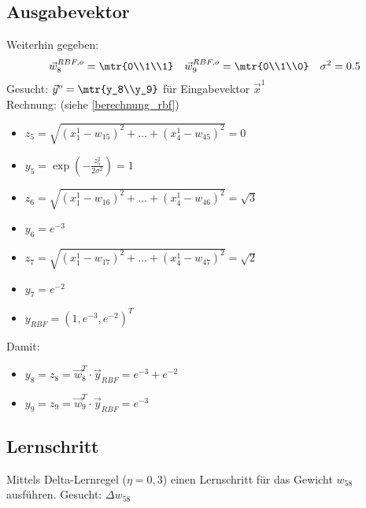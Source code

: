 \subsection{Ausgabevektor}
Weiterhin gegeben:
$$\vec{w}_8^{RBF,o}=\mtr{0\\1\\1} \quad \vec{w}_9^{RBF,o}=\mtr{0\\1\\0} \quad \sigma^2 = 0.5$$
Gesucht: $\vec{y}^{o}=\mtr{y_8\\y_9}$ für Eingabevektor $\vec{x}^1$\\
Rechnung: (siehe \autoref{berechnung_rbf})
\begin{itemize}
\item $z_5 = \sqrt{(x_1^1-w_{15})^2+\ldots+(x_4^1-w_{45})^2}=0$
\item $y_5=\exp\left(- \frac{z_5^2}{2 \sigma^2}\right)=1$
\item $z_6= \sqrt{(x_1^1-w_{16})^2+\ldots+(x_4^1-w_{46})^2}=\sqrt{3}$
\item $y_6 = e^{-3}$
\item $z_7 = \sqrt{(x_1^1-w_{17})^2+\ldots+(x_4^1-w_{47})^2}=\sqrt{2}$
\item $y_7 = e^{-2}$
\item $y_{RBF}=\left(1, e^{-3}, e^{-2}\right)^T$
\end{itemize}
Damit:
\begin{itemize}
\item $y_8=z_8=\vec{w}_8^T \cdot \vec{y}_{RBF} = e^{-3}+e^{-2}$
\item $y_9=z_9=\vec{w}_9^T \cdot \vec{y}_{RBF} = e^{-3}$
\end{itemize}
\subsection{Lernschritt}
Mittels Delta-Lernregel ($\eta=0,3$) einen Lernschritt für das Gewicht $w_{58}$ ausführen. Gesucht: $\Delta w_{58}$








